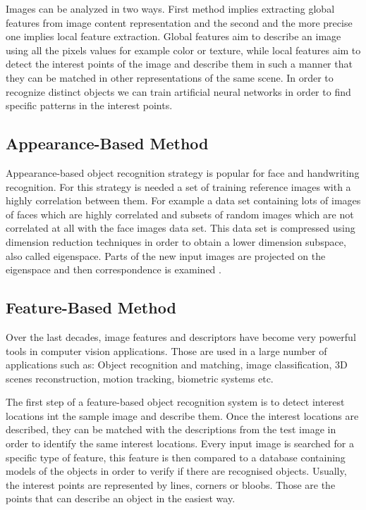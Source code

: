 \documentclass[9pt,shortpaper,twoside,web]{ieeecolor}
\begin{document}
Images can be analyzed in two ways. First method implies extracting global features from image content representation and the second and the more precise one implies local feature extraction. Global features aim to describe an image using all the pixels values for example color or texture, while local features aim to detect the interest points of the image and describe them in such a manner that they can be matched in other representations of the same scene. In order to recognize distinct objects we can train artificial neural networks in order to find specific patterns in the interest points.

\subsection{Appearance-Based Method}
Appearance-based object recognition strategy is popular for face and handwriting recognition. For this strategy is needed a set of training reference images with a highly correlation between them. For example a data set containing lots of images of faces which are highly correlated and subsets of random images which are not correlated at all with the face images data set. This data set is compressed using dimension reduction techniques in order to obtain a lower dimension subspace, also called eigenspace. Parts of the new input images are projected on the eigenspace and then correspondence is examined \cite{b1}.

\subsection{Feature-Based Method}
Over the last decades, image features and descriptors have become very powerful tools in computer vision applications. Those are used in a large number of applications such as: Object recognition and matching, image classification, 3D scenes reconstruction, motion tracking, biometric systems etc.

The first step of a feature-based object recognition system is to detect interest locations int the sample image and describe them. Once the interest locations are described, they can be matched with the descriptions from the test image in order to identify the same interest locations. Every input image is searched for a specific type of feature, this feature is then compared to a database containing models of the objects in order to verify if there are recognised objects. Usually, the interest points are represented by lines, corners or bloobs. Those are the points that can describe an object in the easiest way.
\end{document}
